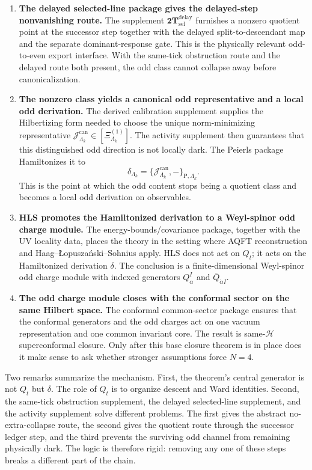 \documentclass[
  aps,
  prd,
  onecolumn,
  notitlepage,
  nofootinbib,
  superscriptaddress,
  10pt
]{revtex4-2}
\theoremstyle{definition}
\theoremstyle{plain}
\begin{document}
\begin{enumerate}[label=\textnormal{(\arabic*)},leftmargin=*,itemsep=0.55em]
  \item \textbf{The delayed selected-line package gives the delayed-step
  nonvanishing route.}  The supplement
  \(\mathbf{2T}_{\mathrm{sel}}^{\mathrm{delay}}\) furnishes a nonzero
  quotient point at the successor step together with the
  delayed split-to-descendant map and the separate dominant-response gate.
  This is the physically relevant odd-to-even export interface.  With the
  same-tick obstruction route and the delayed route both present, the odd class
  cannot collapse away before canonicalization.

  \item \textbf{The nonzero class yields a canonical odd representative and a
  local odd derivation.}  The derived calibration supplement supplies the
  Hilbertizing form needed to choose the unique norm-minimizing representative
  \(\mathcal J^{\mathrm{can}}_{\Lambda_k}\in[\Xi^{(1)}_{\Lambda_k}]\).  The
  activity supplement then guarantees that this distinguished odd direction is
  not locally dark.  The Peierls package Hamiltonizes it to
  \[
  \delta_{\Lambda_k}
  =
  \{\mathcal J^{\mathrm{can}}_{\Lambda_k},-\}_{\mathrm P,\Lambda_k}.
  \]
  This is the point at which the odd content stops being a quotient class and
  becomes a local odd derivation on observables.

  \item \textbf{HLS promotes the Hamiltonized derivation to a Weyl-spinor odd
  charge module.}  The energy-bounds/covariance package, together with the UV
  locality data, places the theory in the setting where AQFT reconstruction and
  Haag--\L opusza\'nski--Sohnius apply.  HLS does not act on \(Q_t\); it acts on
  the Hamiltonized derivation \(\delta\).  The conclusion is a
  finite-dimensional Weyl-spinor odd charge module with indexed generators
  \(Q_\alpha^I\) and \(\bar Q_{\dot\alpha I}\).

  \item \textbf{The odd charge module closes with the conformal sector on the
  same Hilbert space.}  The conformal common-sector package ensures that the
  conformal generators and the odd charges act on one vacuum representation and
  one common invariant core.  The result is same-\(\mathcal H\)
  superconformal closure.  Only after this base closure theorem is in place
  does it make sense to ask whether stronger assumptions force \(N=4\).
\end{enumerate}

Two remarks summarize the mechanism.  First, the theorem’s central generator is
not \(Q_t\) but \(\delta\).  The role of \(Q_t\) is to organize descent and Ward
identities.  Second, the same-tick obstruction supplement, the delayed
selected-line supplement, and the activity supplement solve different problems.
The first gives the abstract no-extra-collapse route, the second gives the
quotient route through the successor ledger step, and the third prevents the surviving odd
channel from remaining physically dark.  The logic is therefore rigid:
removing any one of these steps breaks a different part of the chain.
\end{document}
